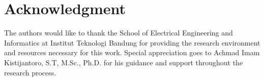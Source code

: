 \section*{Acknowledgment}

The authors would like to thank the School of Electrical Engineering and Informatics at Institut Teknologi Bandung for providing the research environment and resources necessary for this work. Special appreciation goes to Achmad Imam Kistijantoro, S.T, M.Sc., Ph.D. for his guidance and support throughout the research process.